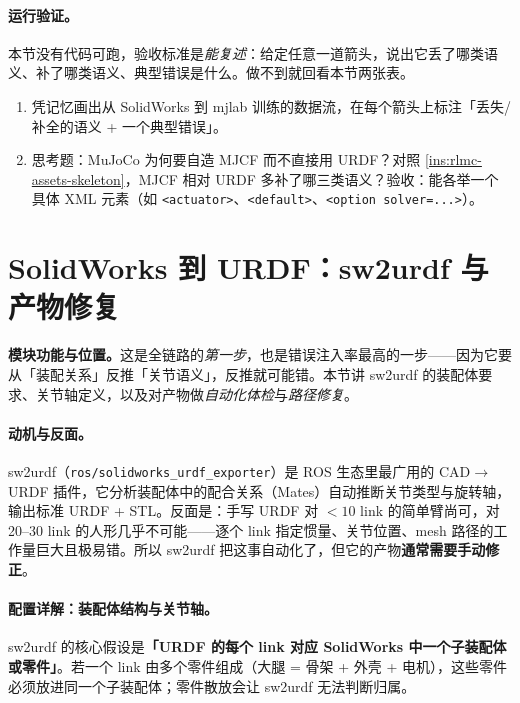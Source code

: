 \paragraph{运行验证。}本节没有代码可跑，验收标准是\emph{能复述}：给定任意一道箭头，说出它丢了哪类语义、补了哪类语义、典型错误是什么。做不到就回看本节两张表。

\begin{practice}[全链路自测]
\begin{enumerate}
  \item 凭记忆画出从 SolidWorks 到 mjlab 训练的数据流，在每个箭头上标注「丢失/补全的语义 + 一个典型错误」。
  \item 思考题：MuJoCo 为何要自造 MJCF 而不直接用 URDF？对照 \cref{ins:rlmc-assets-skeleton}，MJCF 相对 URDF 多补了哪三类语义？验收：能各举一个具体 XML 元素（如 \texttt{<actuator>}、\texttt{<default>}、\texttt{<option solver=...>}）。
\end{enumerate}
\end{practice}

\section{SolidWorks 到 URDF：sw2urdf 与产物修复}
\label{sec:rlmc-assets-sw2urdf}

\textbf{模块功能与位置。}这是全链路的\emph{第一步}，也是错误注入率最高的一步——因为它要从「装配关系」反推「关节语义」，反推就可能错。本节讲 sw2urdf 的装配体要求、关节轴定义，以及对产物做\emph{自动化体检}与\emph{路径修复}。

\paragraph{动机与反面。}sw2urdf（\texttt{ros/solidworks\_urdf\_exporter}）是 ROS 生态里最广用的 CAD$\to$URDF 插件，它分析装配体中的配合关系（Mates）自动推断关节类型与旋转轴，输出标准 URDF + STL。反面是：手写 URDF 对 $<10$ link 的简单臂尚可，对 20--30 link 的人形几乎不可能——逐个 link 指定惯量、关节位置、mesh 路径的工作量巨大且极易错。所以 sw2urdf 把这事自动化了，但它的产物\textbf{通常需要手动修正}。

\paragraph{配置详解：装配体结构与关节轴。}sw2urdf 的核心假设是\textbf{「URDF 的每个 link 对应 SolidWorks 中一个子装配体或零件」}。若一个 link 由多个零件组成（大腿 = 骨架 + 外壳 + 电机），这些零件必须放进同一个子装配体；零件散放会让 sw2urdf 无法判断归属。

